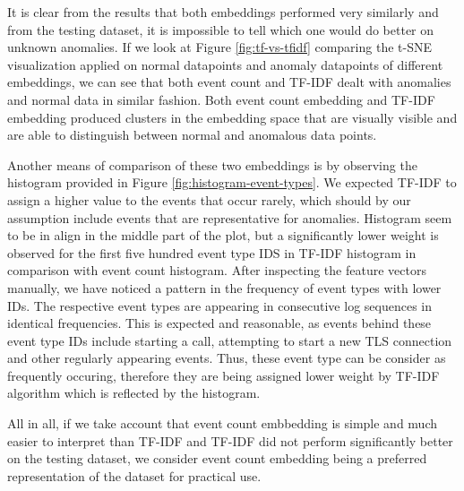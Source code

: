It is clear from the results that both embeddings performed very similarly and from the testing dataset, it is impossible to tell which one would do better on unknown anomalies. If we look at Figure \ref{fig:tf-vs-tfidf} comparing the t-SNE visualization applied on normal datapoints and anomaly datapoints of different embeddings, we can see that both event count and TF-IDF dealt with anomalies and normal data in similar fashion. Both event count embedding and TF-IDF embedding produced clusters in the embedding space that are visually visible and are able to distinguish between normal and anomalous data points.

Another means of comparison of these two embeddings is by observing the histogram provided in Figure \ref{fig:histogram-event-types}. We expected TF-IDF to assign a higher value to the events that occur rarely, which should by our assumption include events that are representative for anomalies. Histogram seem to be in align in the middle part of the plot, but a significantly lower weight is observed for the first five hundred event type IDS in TF-IDF histogram in comparison with event count histogram. After inspecting the feature vectors manually, we have noticed a pattern in the frequency of event types with lower IDs. The respective event types are appearing in consecutive log sequences in identical frequencies. This is expected and reasonable, as events behind these event type IDs include starting a call, attempting to start a new TLS connection and other regularly appearing events. Thus, these event type can be consider as frequently occuring, therefore they are being assigned lower weight by TF-IDF algorithm which is reflected by the histogram.

All in all, if we take account that event count embbedding is simple and much easier to interpret than TF-IDF and TF-IDF did not perform significantly better on the testing dataset, we consider event count embedding being a preferred representation of the dataset for practical use.



